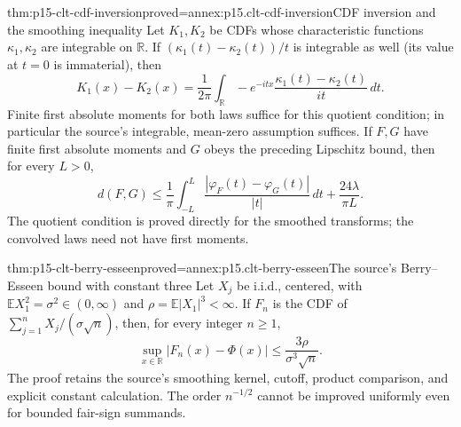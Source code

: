 \begin{hblemma}{thm:p15-clt-cdf-inversion}{proved=annex:p15.clt-cdf-inversion}{CDF inversion and the smoothing inequality}
Let \(K_1,K_2\) be CDFs whose characteristic functions
\(\kappa_1,\kappa_2\) are integrable on \(\mathbb R\).
If \((\kappa_1(t)-\kappa_2(t))/t\) is integrable as well
(its value at \(t=0\) is immaterial), then
\[
 K_1(x)-K_2(x)=\frac1{2\pi}
       \int_{\mathbb R}-e^{-itx}
                 \frac{\kappa_1(t)-\kappa_2(t)}{it}\,dt.
 \]
Finite first absolute moments for both laws suffice for this
quotient condition; in particular the source's integrable,
mean-zero assumption suffices.
If \(F,G\) have finite first absolute moments and \(G\) obeys
the preceding Lipschitz bound, then for every \(L>0\),
\[
 d(F,G)\leq\frac1\pi\int_{-L}^L
       \frac{|\varphi_F(t)-\varphi_G(t)|}{|t|}\,dt
                      +\frac{24\lambda}{\pi L}.
 \]
The quotient condition is proved directly for the smoothed
transforms; the convolved laws need not have first moments.
\end{hblemma}

\begin{hbtheorem}{thm:p15-clt-berry-esseen}{proved=annex:p15.clt-berry-esseen}{The source's Berry--Esseen bound with constant three}
Let \(X_j\) be i.i.d., centered, with
\(\mathbb EX_1^2=\sigma^2\in(0,\infty)\) and
\(\rho=\mathbb E|X_1|^3<\infty\).
If \(F_n\) is the CDF of \(\sum_{j=1}^nX_j/(\sigma\sqrt n)\),
then, for every integer \(n\geq1\),
\[
 \sup_{x\in\mathbb R}|F_n(x)-\Phi(x)|
                         \leq\frac{3\rho}{\sigma^3\sqrt n}.
 \]
The proof retains the source's smoothing kernel, cutoff,
product comparison, and explicit constant calculation.
The order \(n^{-1/2}\) cannot be improved uniformly even for
bounded fair-sign summands.
\end{hbtheorem}

